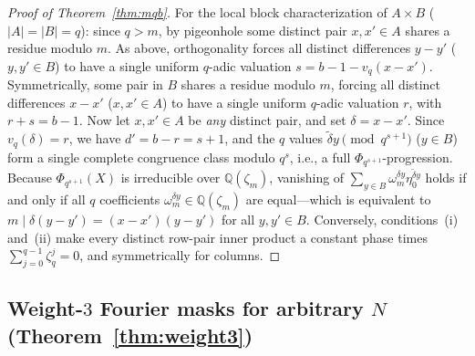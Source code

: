\documentclass[11pt,reqno]{amsart}
\numberwithin{equation}{section}
\theoremstyle{definition}
\theoremstyle{remark}
\newcommand{\Q}{\mathbb{Q}}
\begin{document}
\begin{proof}[Proof of Theorem~\ref{thm:mqb}]
For the local block characterization of $A\times B$ ($|A|=|B|=q$): since $q>m$, by pigeonhole some distinct pair $x,x'\in A$ shares a residue modulo $m$. As above, orthogonality forces all distinct differences $y-y'$ ($y,y'\in B$) to have a single uniform $q$-adic valuation $s=b-1-v_q(x-x')$. Symmetrically, some pair in $B$ shares a residue modulo $m$, forcing all distinct differences $x-x'$ ($x,x'\in A$) to have a single uniform $q$-adic valuation $r$, with $r+s=b-1$. Now let $x,x'\in A$ be \emph{any} distinct pair, and set $\delta=x-x'$. Since $v_q(\delta)=r$, we have $d'=b-r=s+1$, and the $q$ values $\tilde{\delta}y\pmod{q^{s+1}}$ ($y\in B$) form a single complete congruence class modulo $q^s$, i.e., a full $\Phi_{q^{s+1}}$-progression. Because $\Phi_{q^{s+1}}(X)$ is irreducible over $\Q(\zeta_m)$, vanishing of $\sum_{y\in B}\omega_m^{\delta y}\eta_0^{\tilde{\delta}y}$ holds if and only if all $q$ coefficients $\omega_m^{\delta y}\in\Q(\zeta_m)$ are equal---which is equivalent to $m\mid \delta(y-y') = (x-x')(y-y')$ for all $y,y'\in B$. Conversely, conditions~(i) and~(ii) make every distinct row-pair inner product a constant phase times $\sum_{j=0}^{q-1}\zeta_q^j=0$, and symmetrically for columns.
\end{proof}

\subsection{Weight-$3$ Fourier masks for arbitrary $N$ (Theorem~\ref{thm:weight3})}
\end{document}

